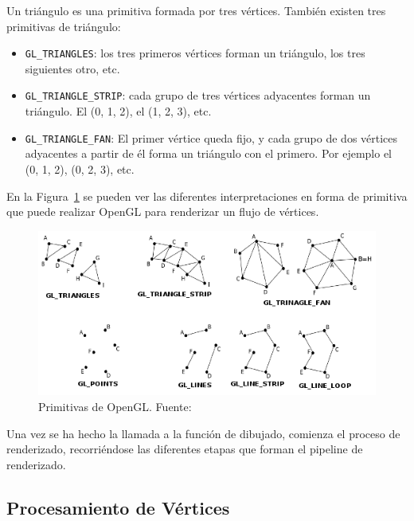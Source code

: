 Un triángulo es una primitiva formada por tres vértices. También existen tres
primitivas de triángulo:

\begin{itemize}
		\item \verb|GL_TRIANGLES|: los tres primeros vértices forman un
				triángulo, los tres siguientes otro, etc.
		\item \verb|GL_TRIANGLE_STRIP|: cada grupo de tres vértices adyacentes
				forman un triángulo. El (0, 1, 2), el (1, 2, 3), etc.
		\item \verb|GL_TRIANGLE_FAN|: El primer vértice queda fijo, y cada grupo
				de dos vértices adyacentes a partir de él forma un triángulo con
				el primero. Por ejemplo el (0, 1, 2), (0, 2, 3), etc.
\end{itemize}

En la Figura~\ref{fig:primitives} se pueden ver las diferentes interpretaciones
en forma de primitiva que puede realizar OpenGL para renderizar un flujo de
vértices. 

\begin{figure}[h]
	\centering	
	\includegraphics[width=\textwidth]{figures/primitives.png}
	\caption[Primitivas de OpenGL]{Primitivas de OpenGL.
	Fuente:~\cite{PrimitiveImage}}
	\label{fig:primitives}
\end{figure}

Una vez se ha hecho la llamada a la función de dibujado, comienza el proceso de
renderizado, recorriéndose las diferentes etapas que forman el pipeline de
renderizado. 

\subsection{Procesamiento de Vértices}
\label{ref:procesamiento}

